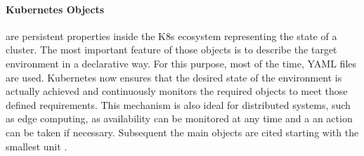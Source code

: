 \documentclass[MSC,Master,english]{twbook}%
\begin{document}
\paragraph{Kubernetes Objects} are persistent properties inside the \ac{K8s} ecosystem representing the state of a cluster. The most important feature of those objects is to describe the target environment in a declarative way. For this purpose, most of the time, YAML files are used. Kubernetes now ensures that the desired state of the environment is actually achieved and continuously monitors the required objects to meet those defined requirements. This mechanism is also ideal for distributed systems, such as edge computing, as availability can be monitored at any time and a an action can be taken if necessary. Subsequent the main objects are cited starting with the smallest unit \cite{k8sconc}.
\end{document}
